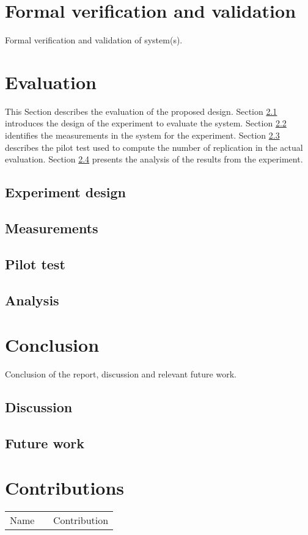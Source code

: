 \documentclass[conference]{IEEEtran}
\begin{document}
\section{Formal verification and validation}
\label{sec:formal_v_and_v}
Formal verification and validation of system(s).


\section{Evaluation}
\label{sec:evaluation}

This Section describes the evaluation of the proposed design.
Section \ref{sec:design} introduces the design of the experiment to evaluate the system. 
Section \ref{sec:measurements} identifies the measurements in the system for the experiment.
Section \ref{sec:pilot_test} describes the pilot test used to compute the number of replication in the actual evaluation. 
Section \ref{sec:analysis} presents the analysis of the results from the experiment. 

\subsection{Experiment design}
\label{sec:design}

\subsection{Measurements}
\label{sec:measurements}

\subsection{Pilot test}
\label{sec:pilot_test}

\subsection{Analysis}
\label{sec:analysis}


\section{Conclusion}
\label{sec:conclusion}
Conclusion of the report, discussion and relevant future work.

\subsection{Discussion}
\label{sec:Discussion}

\subsection{Future work}
\label{sec:future_work}



\vspace{12pt}

\newpage
\section*{Contributions}
\begin{tabular}{l|p{0.6\linewidth}}
Name & Contribution\\
\end{tabular}
\end{document}
